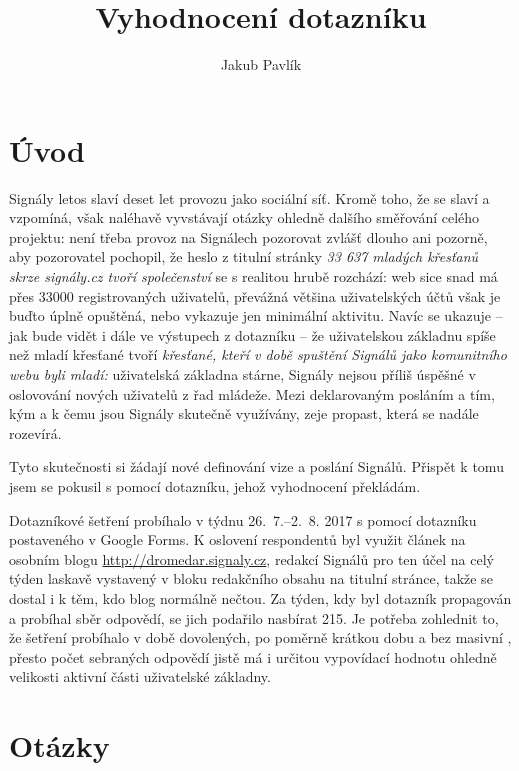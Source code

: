 \documentclass[12pt, a4paper, twoside]{article}
\author{Jakub Pavlík}
\title{Vyhodnocení dotazníku\\ \uv{signaly.cz z pohledu uživatelů}}
\begin{document}
\setlength{\parindent}{0.5cm}

\maketitle

\section*{Úvod}

Signály letos slaví deset let provozu jako sociální síť.
Kromě toho, že se slaví a vzpomíná, však naléhavě vyvstávají otázky
ohledně dalšího směřování celého projektu:
není třeba provoz na Signálech pozorovat zvlášť dlouho ani pozorně,
aby pozorovatel pochopil, že heslo z titulní stránky
\emph{33 637 mladých křesťanů skrze signály.cz tvoří společenství}
se s realitou hrubě rozchází:
web sice snad má přes 33000 registrovaných
uživatelů, převážná většina uživatelských účtů však je buďto
úplně opuštěná, nebo vykazuje jen minimální aktivitu.
Navíc se ukazuje -- jak bude vidět i dále ve výstupech z dotazníku --
že uživatelskou základnu spíše než mladí křesťané
tvoří \emph{křesťané, kteří v době spuštění Signálů jako komunitního
  webu byli mladí:}
uživatelská základna stárne, Signály nejsou příliš úspěšné
v oslovování nových uživatelů z řad mládeže.
Mezi deklarovaným posláním a tím, kým a k čemu jsou Signály skutečně
využívány, zeje propast, která se nadále rozevírá.

Tyto skutečnosti si žádají nové definování vize a poslání Signálů.
Přispět k tomu jsem se pokusil s pomocí dotazníku, jehož vyhodnocení
překládám.

Dotazníkové šetření probíhalo v týdnu 26.~7.--2.~8. 2017
s pomocí dotazníku postaveného v Google Forms.
K oslovení respondentů byl využit článek na osobním blogu
\url{http://dromedar.signaly.cz}, redakcí Signálů pro ten účel
na celý týden laskavě vystavený v bloku redakčního obsahu
na titulní stránce, takže se dostal i k těm, kdo blog normálně
nečtou.
Za týden, kdy byl dotazník propagován a probíhal sběr odpovědí,
se jich podařilo nasbírat 215. Je potřeba zohlednit to, že
šetření probíhalo v době dovolených, po poměrně krátkou dobu
a bez masivní ,
přesto počet sebraných odpovědí jistě má i určitou vypovídací
hodnotu ohledně velikosti aktivní části uživatelské základny.

\section{Otázky}
\end{document}

